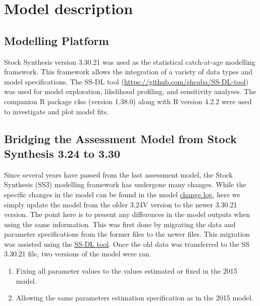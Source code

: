 \documentclass[11pt,
  english,
  letterpaper,
]{article}
\providecommand{\tightlist}{%
  \setlength{\itemsep}{0pt}\setlength{\parskip}{0pt}}
\providecommand{\tightlist}{%
  \setlength{\itemsep}{0pt}\setlength{\parskip}{0pt}}
\begin{document}
\hypertarget{model-description}{%
\section{Model description}\label{model-description}}

\hypertarget{modelling-platform}{%
\subsection{Modelling Platform}\label{modelling-platform}}

Stock Synthesis version 3.30.21 was used as the statistical catch-at-age modelling framework. This framework allows the integration of a variety of data types and model specifications. The SS-DL tool (\url{https://github.com/shcaba/SS-DL-tool}) was used for model exploration, likelihood profiling, and sensitivity analyses. The companion R package r4ss (version 1.38.0) along with R version 4.2.2 were used to investigate and plot model fits.

\hypertarget{bridging-the-assessment-model-from-stock-synthesis-3.24-to-3.30}{%
\subsection{Bridging the Assessment Model from Stock Synthesis 3.24 to 3.30}\label{bridging-the-assessment-model-from-stock-synthesis-3.24-to-3.30}}

Since several years have passed from the last assessment model, the Stock Synthesis (SS3) modelling framework has undergone many changes. While the specific changes in the model can be found in the model \href{https://github.com/nmfs-stock-synthesis/stock-synthesis/blob/v3.30.19/Change_log_for_SS_3.30.xlsx?raw=true}{change log}, here we simply update the model from the older 3.24V version to the newer 3.30.21 version. The point here is to present any differences in the model outputs when using the same information. This was first done by migrating the data and parameter specifications from the former files to the newer files. This migration was assisted using the \href{https://github.com/shcaba/SS-DL-tool}{SS-DL tool}. Once the old data was transferred to the SS 3.30.21 file, two versions of the model were ran.

\begin{enumerate}
\def\labelenumi{\arabic{enumi})}
\tightlist
\item
  Fixing all parameter values to the values estimated or fixed in the 2015 model.
\item
  Allowing the same parameters estimation specification as in the 2015 model.
\end{enumerate}
\end{document}
